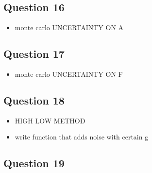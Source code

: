 \documentclass[11pt,a4paper]{article}
\begin{document}
\subsection*{Question 16}
\begin{itemize}
	\item monte carlo UNCERTAINTY ON A
\end{itemize}

\subsection*{Question 17}
\begin{itemize}
	\item monte carlo UNCERTAINTY ON F
\end{itemize}

\subsection*{Question 18}
\begin{itemize}
	\item HIGH LOW METHOD
	\item write function that adds noise with certain g
\end{itemize}

\subsection*{Question 19}
\end{document}
